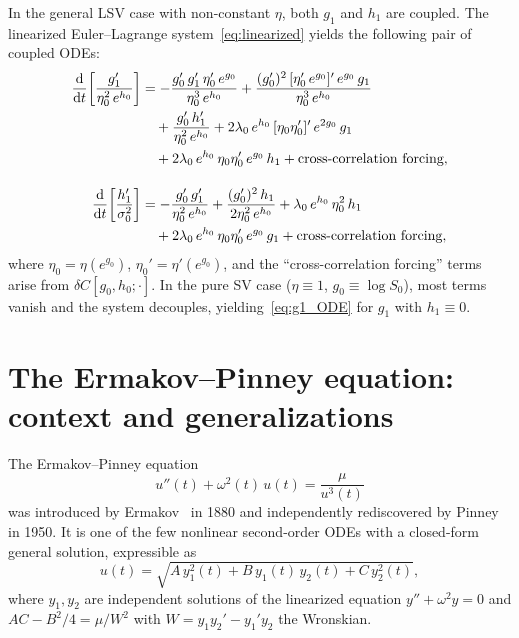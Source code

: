 \documentclass[11pt]{article}
\theoremstyle{definition}
\newcommand{\dd}{\mathrm{d}}
\begin{document}
In the general LSV case with non-constant $\eta$, both $g_1$ and $h_1$ are coupled. The linearized Euler--Lagrange system~\eqref{eq:linearized} yields the following pair of coupled ODEs:
\begin{align}
  \frac{\dd}{\dd t}\!\left[\frac{g_1'}{\eta_0^2\,e^{h_0}}\right] &= -\frac{g_0'\,g_1'\,\eta_0'\,e^{g_0}}{\eta_0^3\,e^{h_0}} + \frac{(g_0')^2\,[\eta_0'\,e^{g_0}]'\,e^{g_0}\,g_1}{\eta_0^3\,e^{h_0}} \notag\\
  &\quad + \frac{g_0'\,h_1'}{\eta_0^2\,e^{h_0}} + 2\lambda_0\,e^{h_0}\,[\eta_0\eta_0']'\,e^{2g_0}\,g_1 \notag\\
  &\quad + 2\lambda_0\,e^{h_0}\,\eta_0\eta_0'\,e^{g_0}\,h_1 + \text{cross-correlation forcing}, \label{eq:g1_general}\\[1em]
  \frac{\dd}{\dd t}\!\left[\frac{h_1'}{\sigma_0^2}\right] &= -\frac{g_0'\,g_1'}{\eta_0^2\,e^{h_0}} + \frac{(g_0')^2\,h_1}{2\eta_0^2\,e^{h_0}} + \lambda_0\,e^{h_0}\,\eta_0^2\,h_1 \notag\\
  &\quad + 2\lambda_0\,e^{h_0}\,\eta_0\eta_0'\,e^{g_0}\,g_1 + \text{cross-correlation forcing}, \label{eq:h1_general}
\end{align}
where $\eta_0 = \eta(e^{g_0})$, $\eta_0' = \eta'(e^{g_0})$, and the ``cross-correlation forcing'' terms arise from $\delta C[g_0, h_0; \cdot]$. In the pure SV case ($\eta \equiv 1$, $g_0 \equiv \log S_0$), most terms vanish and the system decouples, yielding~\eqref{eq:g1_ODE} for $g_1$ with $h_1 \equiv 0$.

\section{The Ermakov--Pinney equation: context and generalizations}\label{app:ermakov_context}

The Ermakov--Pinney equation
\begin{equation}
  u''(t) + \omega^2(t)\,u(t) = \frac{\mu}{u^3(t)}
\end{equation}
was introduced by Ermakov~\cite{Ermakov1880} in 1880 and independently rediscovered by Pinney~\cite{Pinney1950} in 1950. It is one of the few nonlinear second-order ODEs with a closed-form general solution, expressible as
\begin{equation}
  u(t) = \sqrt{A\,y_1^2(t) + B\,y_1(t)\,y_2(t) + C\,y_2^2(t)},
\end{equation}
where $y_1, y_2$ are independent solutions of the linearized equation $y'' + \omega^2 y = 0$ and $AC - B^2/4 = \mu/W^2$ with $W = y_1 y_2' - y_1' y_2$ the Wronskian.
\end{document}
